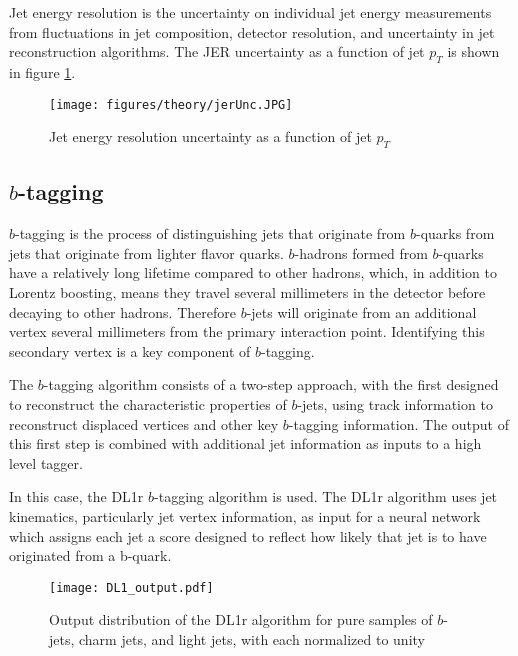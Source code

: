 Jet energy resolution is the uncertainty on individual jet energy measurements from fluctuations in jet composition, detector resolution, and uncertainty in jet reconstruction algorithms. The JER uncertainty as a function of jet $p_T$ is shown in figure \ref{fig:jerUnc}.

\begin{figure}[H]
\centering
   \texttt{[image: figures/theory/jerUnc.JPG]}
\caption{Jet energy resolution uncertainty as a function of jet $p_T$ \cite{atlascollaboration2020jet}}
\label{fig:jerUnc}
\end{figure}

\subsection{$b$-tagging}
\label{subsec:bjets}

$b$-tagging is the process of distinguishing jets that originate from $b$-quarks from jets that originate from lighter flavor quarks. $b$-hadrons formed from $b$-quarks have a relatively long lifetime compared to other hadrons, which, in addition to Lorentz boosting, means they travel several millimeters in the detector before decaying to other hadrons. Therefore $b$-jets will originate from an additional vertex several millimeters from the primary interaction point. Identifying this secondary vertex is a key component of $b$-tagging.

The $b$-tagging algorithm consists of a two-step approach, with the first designed to reconstruct the characteristic properties of $b$-jets, using track information to reconstruct displaced vertices \cite{Heer:2017kbn} and other key $b$-tagging information. The output of this first step is combined with additional jet information as inputs to a high level tagger.

In this case, the DL1r $b$-tagging algorithm is used. The DL1r algorithm \cite{btag_cal} uses jet kinematics, particularly jet vertex information, as input for a neural network which assigns each jet a score designed to reflect how likely that jet is to have originated from a b-quark. 

\begin{figure}[H] 
    \centering
    \texttt{[image: DL1\_output.pdf]} 
    \caption{Output distribution of the DL1r algorithm for pure samples of $b$-jets, charm jets, and light jets, with each normalized to unity \cite{btag_cal}}
    \label{fig:DL1r}
\end{figure}

